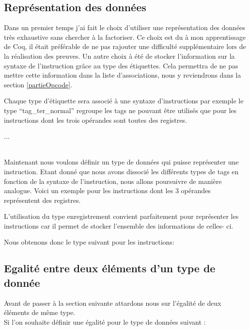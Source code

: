 \documentclass {article}
\newcommand{\codefrom}[3]
           {}
\theoremstyle{definition}
\theoremstyle{remark}
\begin{document}
\subsection{Représentation des données}
\label{representation des donnees}

Dans un premier temps j'ai fait le choix d'utiliser une représentation des données très exhaustive sans
chercher à la factoriser. Ce choix est du à mon apprentissage de Coq, il était préférable de ne pas
rajouter une difficulté supplémentaire lors de la réalisation des preuves.
Un autre choix à été de stocker l'information sur la syntaxe de l'instruction grâce au type des étiquettes.
Cela permettra de ne pas mettre cette information dans la liste d'associations, nous y reviendrons dans la
section \ref{partieOpcode}.

\codefrom{src}{ast_instructions}{tag}

Chaque type d'étiquette sera associé à une syntaxe d'instructions par exemple le type ``tag\_ter\_normal''
regroupe les tags ne pouvant être utilisés que pour les instructions dont les trois
opérandes sont toutes des registres.

\codefrom{src}{ast_instructions}{tag_definition}
...

\\ 

Maintenant nous voulons définir un type de données qui puisse représenter une instruction.
Etant donné que nous avons dissocié les différents types de tags en fonction de la syntaxe de l'instruction,
nous allons poursuivre de manière analogue.
Voici un exemple pour les instructions dont les 3 opérandes représentent des registres.

\codefrom{src}{ast_instructions}{instruction_tern_n}

L'utilisation du type enregistrement convient parfaitement pour représenter les instructions car il permet de stocker
l'ensemble des informations de celles- ci.

Nous obtenons donc le type suivant pour les instructions:
\codefrom{src}{ast_instructions}{instruction}




\subsection{Egalité entre deux éléments d'un type de donnée}
Avant de passer à la section suivante attardons nous sur l'égalité de deux éléments de même type.
\\
Si l'on souhaite définir une égalité pour le type de données suivant :
\codefrom{rapport}{definitions}{example_type}
\end{document}
